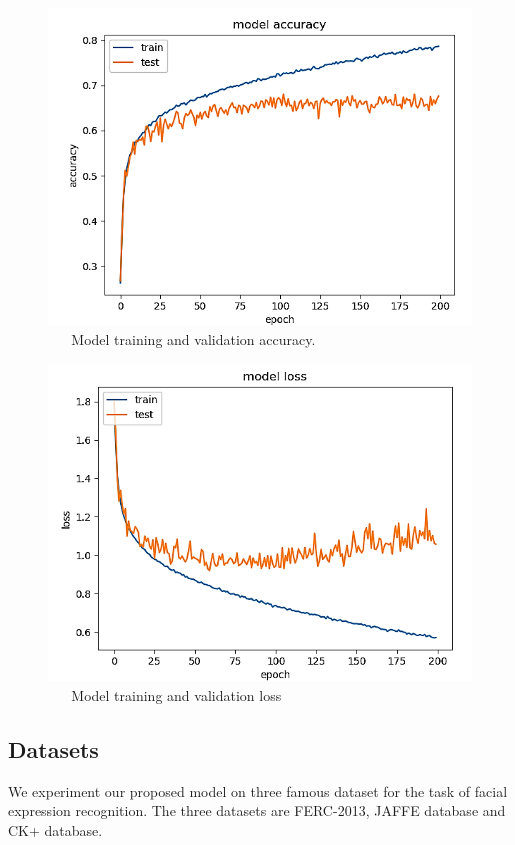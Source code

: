 \documentclass[master]{thesis-uestc}
\begin{document}
\begin{figure}[ht]
\includegraphics[width=5in]{pic/model_accuracy_fer.png}
\caption{\,\,\,\,\,\,\,\,\,\,Model training and validation accuracy.}
\label{fer_accuracy}
\end{figure}

\begin{figure}[ht]
\includegraphics[width=5in]{pic/model_loss_fer.png}
\caption{\,\,\,\,\,\,\,\,\,\,Model training and validation loss}
\label{fer_loss}
\end{figure}

\subsection{Datasets}
We experiment our proposed model on three famous dataset for the task of facial expression recognition. The three datasets are FERC-2013, JAFFE database and CK+ database.
\end{document}
